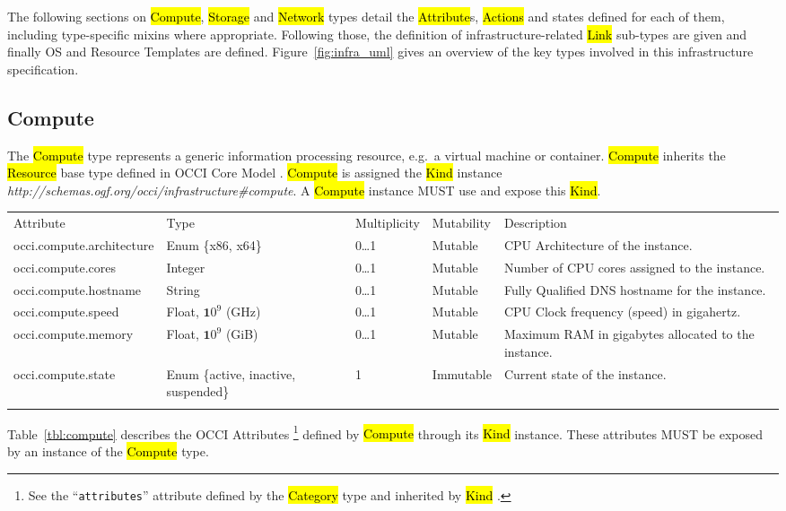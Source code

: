\documentclass[10pt,a4paper]{article}
\begin{document}
The following sections on \hl{Compute}, \hl{Storage} and \hl{Network}
types detail the \hl{Attribute}s, \hl{Actions} and states defined for
each of them, including type-specific mixins where appropriate. 
Following those, the definition of infrastructure-related \hl{Link} 
sub-types are given and finally OS and Resource Templates 
are defined. Figure~\ref{fig:infra_uml} gives an overview of 
the key types involved in this infrastructure specification.

\subsection{Compute}
The \hl{Compute} type represents a generic information processing
resource, e.g.~a virtual machine or container. \hl{Compute} inherits
the \hl{Resource} base type defined in OCCI Core Model
\cite{occi:core}.  \hl{Compute} is assigned the \hl{Kind} instance
\textit{http://schemas.ogf.org/occi/infrastructure\#compute}.  A
\hl{Compute} instance MUST use and expose this \hl{Kind}.

{
	\begin{tabular}{lp{2.5cm}p{1cm}lp{6cm}}
	\toprule
	Attribute&Type&Multi\-plicity&Mutability&Description\\
	\colrule
	occi.compute.architecture & Enum \{x86, x64\} & 0\ldots1 
	& Mutable & CPU Architecture of the instance.\\
	occi.compute.cores & Integer & 0\ldots1 & Mutable 
	& Number of CPU cores assigned to the instance.\\
	occi.compute.hostname & String & 0\ldots1 
	& Mutable & Fully Qualified DNS hostname for the instance.\\
	occi.compute.speed & Float, ${\mathbf 10}^9$ (GHz) & 0\ldots1 
	& Mutable & CPU Clock frequency (speed) in gigahertz.\\
	occi.compute.memory & Float, ${\mathbf 10}^9$ (GiB) & 0\ldots1 
	& Mutable & Maximum RAM in gigabytes allocated to the instance.\\
	occi.compute.state & Enum \{active, inactive, suspended\} & 1 
	& Immutable & Current state of the instance.\\
	\botrule
	\end{tabular}
}

Table~\ref{tbl:compute} describes the OCCI Attributes%
\footnote{See the ``{\tt attributes}'' attribute defined by the
  \hl{Category} type and inherited by \hl{Kind} \cite{occi:core}.}
defined by \hl{Compute} through its \hl{Kind} instance. These
attributes MUST be exposed by an instance of the \hl{Compute} type.
\end{document}
